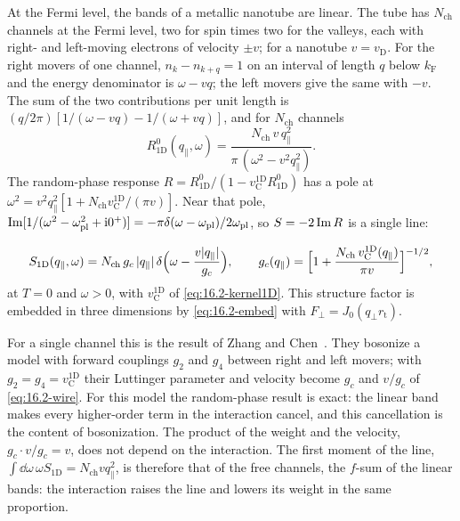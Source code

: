 At the Fermi level, the bands of a metallic nanotube are linear. The tube has $N_{\mathrm{ch}}$ channels at the Fermi level, two for spin times two for the valleys, each with right- and left-moving electrons of velocity $\pm v$; for a nanotube $v = v_{\mathrm{D}}$. For the right movers of one channel, $n_k - n_{k+q} = 1$ on an interval of length $q$ below $k_{\mathrm{F}}$ and the energy denominator is $\omega - vq$; the left movers give the same with $-v$. The sum of the two contributions per unit length is $(q/2\pi)[1/(\omega - vq) - 1/(\omega + vq)]$, and for $N_{\mathrm{ch}}$ channels
\begin{equation*}
  R^0_{\mathrm{1D}}(q_\parallel,\omega) = \frac{N_{\mathrm{ch}}\,v\,q_\parallel^2}{\pi\,(\omega^2 - v^2q_\parallel^2)} .
\end{equation*}
The random-phase response $R = R^0_{\mathrm{1D}}/(1 - v_{\mathrm{C}}^{\mathrm{1D}}R^0_{\mathrm{1D}})$ has a pole at $\omega^2 = v^2q_\parallel^2[1 + N_{\mathrm{ch}}v_{\mathrm{C}}^{\mathrm{1D}}/(\pi v)]$. Near that pole, $\operatorname{Im}[1/(\omega^2 - \omega_{\mathrm{pl}}^2 + \mathrm{i}0^+)] = -\pi\delta(\omega - \omega_{\mathrm{pl}})/2\omega_{\mathrm{pl}}$, so $S = -2\operatorname{Im} R$ is a single line:
\begin{keyresult}
\begin{equation}
  S_{\mathrm{1D}}(q_\parallel,\omega) = N_{\mathrm{ch}}\,g_c\,|q_\parallel|\,\delta\Bigl(\omega - \frac{v|q_\parallel|}{g_c}\Bigr) , \qquad
  g_c(q_\parallel) = \Bigl[1 + \frac{N_{\mathrm{ch}}\,v_{\mathrm{C}}^{\mathrm{1D}}(q_\parallel)}{\pi v}\Bigr]^{-1/2} ,
  \label{eq:16.2-wire}
\end{equation}
at $T = 0$ and $\omega > 0$, with $v_{\mathrm{C}}^{\mathrm{1D}}$ of \cref{eq:16.2-kernel1D}. This structure factor is embedded in three dimensions by \cref{eq:16.2-embed} with $F_\perp = J_0(q_\perp r_{\mathrm{t}})$.
\end{keyresult}
\noindent For a single channel this is the result of Zhang and Chen~\cite[Eqs.~(3), (4)]{zhang2026luttinger}. They bosonize a model with forward couplings $g_2$ and $g_4$ between right and left movers; with $g_2 = g_4 = v_{\mathrm{C}}^{\mathrm{1D}}$ their Luttinger parameter and velocity become $g_c$ and $v/g_c$ of \cref{eq:16.2-wire}. For this model the random-phase result is exact: the linear band makes every higher-order term in the interaction cancel, and this cancellation is the content of bosonization. The product of the weight and the velocity, $g_c\cdot v/g_c = v$, does not depend on the interaction. The first moment of the line, $\int\dd\omega\,\omega S_{\mathrm{1D}} = N_{\mathrm{ch}}vq_\parallel^2$, is therefore that of the free channels, the $f$-sum of the linear bands: the interaction raises the line and lowers its weight in the same proportion.

